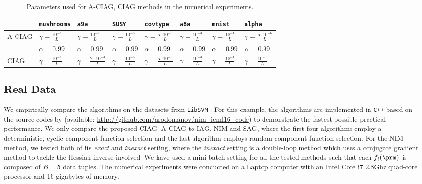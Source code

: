 \documentclass[smallextended]{svjour3}       %
\begin{document}
\begin{table}[h]
\begin{center}
\renewcommand\baselinestretch{1.25}\selectfont
\setlength\tabcolsep{4pt}
{\scriptsize
\begin{tabular}{l l l l l l l l}
\toprule
 & \texttt{mushrooms} & \texttt{a9a} & \texttt{SUSY} & \texttt{covtype} & \texttt{w8a} & \texttt{mnist} & \texttt{alpha} \\ 
\midrule
{\sf A-CIAG} &$\gamma = \frac{10^{-3}}{L}$&$\gamma = \frac{10^{-4}}{ L}$&$\gamma = \frac{10^{-5}}{ L}$&$\gamma = \frac{5 \cdot 10^{-6}}{L}$&$\gamma = \frac{10^{-3}}{L}$&$\gamma = \frac{10^{-4}}{L}$&$\gamma = \frac{5 \cdot 10^{-6}}{ L}$\\
& $\alpha = 0.99$& $\alpha = 0.99$ & $\alpha = 0.99$ & $\alpha =0.99$ & $\alpha = 0.99$
& $\alpha = 0.99$ & $\alpha = 0.99$ \\
\midrule
{\sf CIAG}&$\gamma = \frac{10^{-3}}{L}$&$\gamma = \frac{2 \cdot 10^{-4}}{ L}$&$\gamma = \frac{10^{-5}}{ L}$&$\gamma = \frac{5 \cdot 10^{-6}}{L}$&$\gamma = \frac{10^{-3}}{L}$&$\gamma = \frac{10^{-4}}{L}$&$\gamma = \frac{ 10^{-5}}{ L}$\\
\bottomrule
\end{tabular}\vspace{-.2cm}}
\end{center}
\caption{Parameters used for {\sf A-CIAG}, {\sf CIAG}
methods in the numerical experiments.} \label{tab:stepsize}\vspace{-.6cm}
\end{table}

\subsection{Real Data} We empirically compare the algorithms on the
datasets from \texttt{LibSVM} \cite{CC01a}. 
For this example, the algorithms are implemented in \texttt{C++} based on 
the source codes by \cite{rodomanov2016superlinearly} (available: \url{http://github.com/arodomanov/nim_icml16_code}) to demonstrate the fastest possible practical performance.
We only compare 
the proposed {\sf CIAG}, {\sf A-CIAG} to {\sf IAG}, {\sf NIM} and {\sf SAG},
where the first four algorithms employ a
deterministic, cyclic component function selection
and the last algorithm employs random component function selection. 
For the {\sf NIM} method, we tested both of its \emph{exact}
and \emph{inexact} setting, where the \emph{inexact} setting is a double-loop
method which uses 
a conjugate gradient method to tackle the Hessian inverse involved. 
We have used a mini-batch setting for all the tested methods
such that each $f_i(\prm)$ is composed of $B=5$ data tuples. 
The numerical experiments were conducted on a Laptop computer with 
an Intel Core i7 2.8Ghz quad-core processor and 16 gigabytes of memory. 
\end{document}

